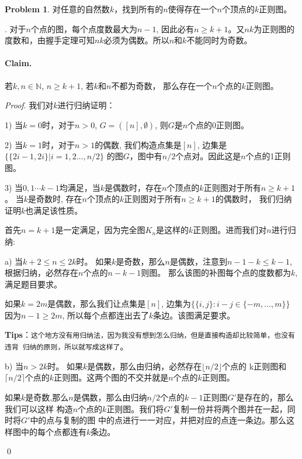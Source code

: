 \documentclass[UTF8]{ctexart}
\newenvironment{sol}
  {\par\vspace{3mm}\noindent{\it Solution}.}
  {\qed \\ \medskip}
\theoremstyle{definition}
\newtheorem{problem}{Problem}
\begin{document}
\begin{problem}
对任意的自然数$k$，找到所有的$n$使得存在一个$n$个顶点的$k$正则图。
\begin{sol}
  对于$n$个点的图，每个点度数最大为$n-1$, 因此必有$n \geq k + 1$。又$nk$为正则图的
  度数和，由握手定理可知$nk$必须为偶数。所以$n$和$k$不能同时为奇数。
  \paragraph{Claim.} 若$k, n \in \mathbb{N}$, $n \geq k + 1$, 若$k$和$n$不都为奇数，
  那么存在一个$n$个点的$k$正则图。

  {\it Proof}. 
  我们对$k$进行归纳证明：

  1) 当$k=0$时，对于$n > 0$, $G = ([n],
   \emptyset)$, 则$G$是$n$个点的0正则图。

  2) 当$k=1$时，对于$n > 1$的偶数, 我们构造点集是$[n]$, 边集是$\{ \{ 2i-1, 2i \}| i = 1, 2\dots, n/2\}$
  的图$G$，图中有$n/2$个点对。因此这是$n$个点的1正则图。
  
  3) 当$0,1\cdots k-1$均满足，当$k$是偶数时，存在$n$个顶点的$k$正则图对于所有$n \geq k + 1$。
  当$k$是奇数时, 存在$n$个顶点的$k$正则图对于所有$n \geq k + 1$的偶数时，
  我们归纳证明$k$也满足该性质。

  首先$n=k+1$是一定满足，因为完全图$K_n$是这样的$k$正则图。进而我们对$n$进行归纳:

  a) 当$k + 2 \leq n \leq 2k$时。
  如果$k$是奇数，那么$n$是偶数，注意到$n-1-k\leq k-1$, 根据归纳，必然存在$n$个点的$n-k-1$则图。
  那么该图的补图每个点的度数都为$k$,满足题目要求。

  如果$k=2m$是偶数，那么我们让点集是$[n]$, 边集为$\{ \{ i, j\} : i - j \in \{ -m,\dots,m \} \}$
  因为$n-1\geq2m$, 所以每个点都连出去了$k$条边。该图满足要求。

  \textbf{Tips}：\texttt{这个地方没有用归纳法，因为我没有想到怎么归纳，但是直接构造却比较简单，也没有违背
  归纳的原则，所以就写成这样了}。

  b) 当$n > 2k$时。
  如果$k$是偶数，那么由归纳，必然存在$\lfloor n/2 \rfloor$个点的
  k正则图和$\lceil n/2 \rceil$个点的$k$正则图。这两个图的不交并就是$n$个点的$k$正则图。

  如果$k$是奇数,那么$n$是偶数，那么由归纳$n/2$个点的$k-1$正则图$G'$是存在的，那么我们可以这样
  构造$n$个点的$k$正则图。我们将$G'$复制一份并将两个图并在一起，同时将$G'$中的点与复制的图
  中的点进行一一对应，并把对应的点连一条边。那么这样图中的每个点都连有$k$条边。

\end{sol}
\end{problem}
\end{document}
